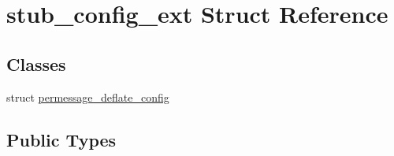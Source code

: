 \hypertarget{structstub__config__ext}{}\section{stub\+\_\+config\+\_\+ext Struct Reference}
\label{structstub__config__ext}
\subsection*{Classes}
\begin{DoxyCompactItemize}
\item 
struct \mbox{\hyperlink{structstub__config__ext_1_1permessage__deflate__config}{permessage\+\_\+deflate\+\_\+config}}
\end{DoxyCompactItemize}
\subsection*{Public Types}
